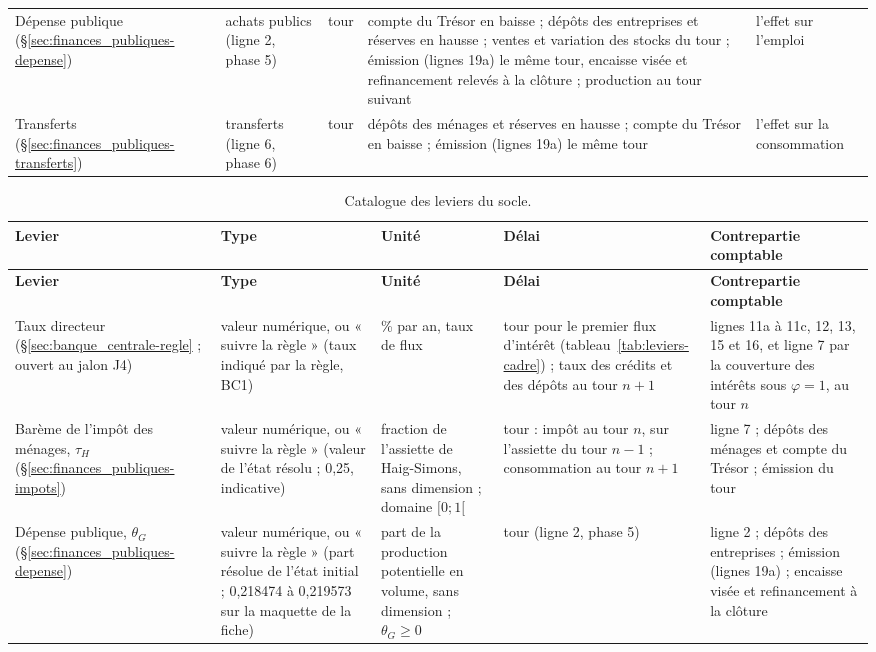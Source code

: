 \documentclass[11pt,a4paper]{article}
\begin{document}
\begin{center}
\begin{longtable}{>{\raggedright\arraybackslash}p{2.3cm}>{\raggedright\arraybackslash}p{3.0cm}>{\raggedright\arraybackslash}p{1.1cm}>{\raggedright\arraybackslash}p{4.7cm}>{\raggedright\arraybackslash}p{2.9cm}}
Dépense publique (\S\ref{sec:finances_publiques-depense}) & achats publics (ligne 2, phase 5) & 0 tour & compte du Trésor en baisse ; dépôts des entreprises et réserves en hausse ; ventes et variation des stocks du tour ; émission (lignes 19a) le même tour, encaisse visée et refinancement relevés à la clôture ; production au tour suivant & l'effet sur l'emploi\\
Transferts (\S\ref{sec:finances_publiques-transferts}) & transferts (ligne 6, phase 6) & 0 tour & dépôts des ménages et réserves en hausse ; compte du Trésor en baisse ; émission (lignes 19a) le même tour & l'effet sur la consommation\\
\bottomrule
\end{longtable}
\end{center}

\begin{center}\small
\begin{longtable}{>{\raggedright\arraybackslash}p{3.2cm}>{\raggedright\arraybackslash}p{2.2cm}>{\raggedright\arraybackslash}p{2.2cm}>{\raggedright\arraybackslash}p{2.2cm}>{\raggedright\arraybackslash}p{4.3cm}}
\caption{Catalogue des leviers du socle.}\label{tab:leviers}\\
\toprule
\textbf{Levier} & \textbf{Type} & \textbf{Unité} & \textbf{Délai} & \textbf{Contrepartie comptable}\\
\midrule
\endfirsthead
\toprule
\textbf{Levier} & \textbf{Type} & \textbf{Unité} & \textbf{Délai} & \textbf{Contrepartie comptable}\\
\midrule
\endhead
Taux directeur (\S\ref{sec:banque_centrale-regle} ; ouvert au jalon J4) & valeur numérique, ou « suivre la règle » (taux indiqué par la règle, BC1) & \% par an, taux de flux & 0 tour pour le premier flux d'intérêt (tableau~\ref{tab:leviers-cadre}) ; taux des crédits et des dépôts au tour $n + 1$ & lignes 11a à 11c, 12, 13, 15 et 16, et ligne 7 par la couverture des intérêts sous $\varphi = 1$, au tour $n$\\
Barème de l'impôt des ménages, $\tau_H$ (\S\ref{sec:finances_publiques-impots}) & valeur numérique, ou « suivre la règle » (valeur de l'état résolu ; 0,25, indicative) & fraction de l'assiette de Haig-Simons, sans dimension ; domaine $[0 ; 1[$ & 0 tour : impôt au tour $n$, sur l'assiette du tour $n - 1$ ; consommation au tour $n + 1$ & ligne 7 ; dépôts des ménages et compte du Trésor ; émission du tour\\
Dépense publique, $\theta_G$ (\S\ref{sec:finances_publiques-depense}) & valeur numérique, ou « suivre la règle » (part résolue de l'état initial ; 0,218474 à 0,219573 sur la maquette de la fiche) & part de la production potentielle en volume, sans dimension ; $\theta_G \ge 0$ & 0 tour (ligne 2, phase 5) & ligne 2 ; dépôts des entreprises ; émission (lignes 19a) ; encaisse visée et refinancement à la clôture\\

\end{longtable}
\end{center}
\end{document}

